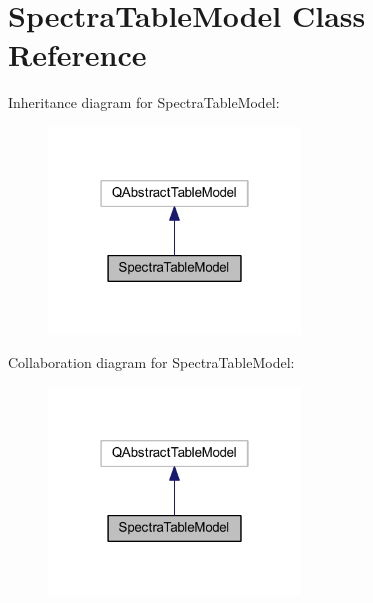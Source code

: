 \hypertarget{class_spectra_table_model}{\section{Spectra\+Table\+Model Class Reference}
\label{class_spectra_table_model}
}


Inheritance diagram for Spectra\+Table\+Model\+:\nopagebreak
\begin{figure}[H]
\begin{center}
\leavevmode
\includegraphics[width=190pt]{class_spectra_table_model__inherit__graph}
\end{center}
\end{figure}


Collaboration diagram for Spectra\+Table\+Model\+:\nopagebreak
\begin{figure}[H]
\begin{center}
\leavevmode
\includegraphics[width=190pt]{class_spectra_table_model__coll__graph}
\end{center}
\end{figure}
